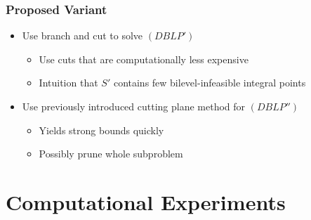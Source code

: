 \documentclass[11pt]{beamer}
\begin{document}
\begin{frame}
	\frametitle{Proposed Variant}
	\begin{itemize}
		\item Use branch and cut to solve $(DBLP')$
		\begin{itemize}
			\item Use cuts that are computationally less expensive
			\item Intuition that $S'$ contains few bilevel-infeasible integral points
		\end{itemize}
		\item Use previously introduced cutting plane method for $(DBLP'')$
		\begin{itemize}
			\item Yields strong bounds quickly
			\item Possibly prune whole subproblem
		\end{itemize}
	\end{itemize}
\end{frame}

\section{Computational Experiments}
\end{document}
